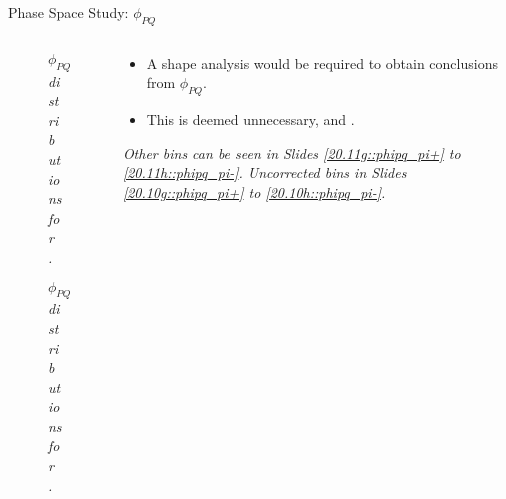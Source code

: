 \begin{frame}{Phase Space Study: $\phi_{PQ}$}
    \label{12.16::phipq}

    \begin{columns}[onlytextwidth,T]

    \begin{column}{.44\linewidth}
        \vspace{-15pt}
        \begin{center}
            \begin{figure}[t]
                \scriptsize{\textit{$\phi_{PQ}$ distributions for \ef{$\pi^-$}.}}
            \end{figure}

            \vspace{-15pt}
            \begin{figure}[t]
                \scriptsize{\textit{$\phi_{PQ}$ distributions for \ef{$\pi^+$}.}}
            \end{figure}
        \end{center}
    \end{column}

    \begin{column}{.54\linewidth}
        \begin{itemize}
            \item
                A shape analysis would be required to obtain conclusions from $\phi_{PQ}$.

            \vspace{12pt}
            \item
                This is deemed unnecessary, and .
        \end{itemize}

        \vspace{126pt}

        \begin{flushright}
            \tiny{\textit{
                Other bins can be seen in Slides \textcolor{efd_purple}{\ref{20.11g::phipq_pi+}} to \textcolor{efd_purple}{\ref{20.11h::phipq_pi-}}.
                Uncorrected bins in Slides \textcolor{efd_purple}{\ref{20.10g::phipq_pi+}} to \textcolor{efd_purple}{\ref{20.10h::phipq_pi-}}.
            }}
        \end{flushright}
    \end{column}

    \end{columns}
\end{frame}
